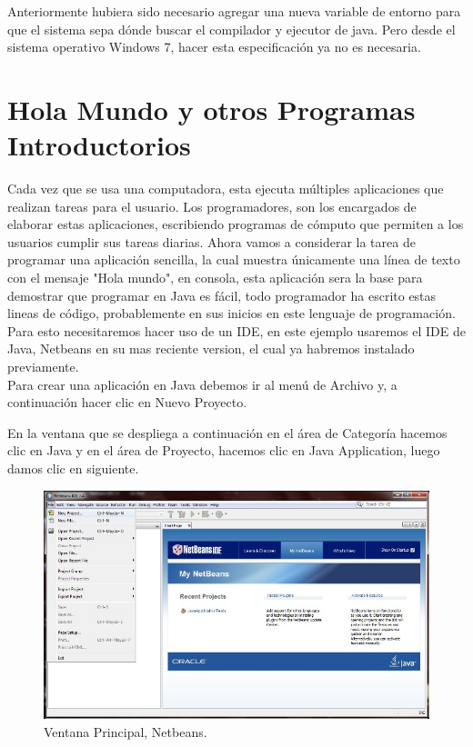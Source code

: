 \documentclass[12pt]{book} %
\begin{document}
Anteriormente hubiera sido necesario agregar una nueva variable de entorno para que el sistema sepa dónde buscar el compilador y ejecutor de java. Pero desde el sistema operativo Windows 7, hacer esta especificación ya no es necesaria.


\chapter{Hola Mundo y otros Programas Introductorios}

Cada vez que se usa una computadora, esta ejecuta múltiples aplicaciones que realizan tareas para el usuario. Los programadores, son los encargados de elaborar estas aplicaciones, escribiendo programas de cómputo que permiten a los usuarios cumplir sus tareas diarias.
Ahora vamos a considerar la tarea de programar una aplicación sencilla, la cual muestra únicamente una línea de texto con el mensaje "Hola mundo", en consola, esta aplicación sera la base para demostrar que programar en Java es fácil, todo programador ha escrito estas lineas de código, probablemente en sus inicios en este lenguaje de programación.
Para esto necesitaremos hacer uso de un IDE, en este ejemplo usaremos el IDE de Java, Netbeans en su mas reciente version, el cual ya habremos instalado previamente. \\Para crear una aplicación en Java debemos ir al menú de Archivo y, a continuación hacer clic en Nuevo Proyecto.

En la ventana que se despliega a continuación en el área de Categoría hacemos clic en Java y en el área de Proyecto, hacemos clic en Java Application, luego damos clic en siguiente.

	\begin{figure}[h]
		\centering
			\includegraphics[width=16cm]{Hola_mundo_001.jpg}
			\caption{Ventana Principal, Netbeans.}
		
	\end{figure}
\end{document}
